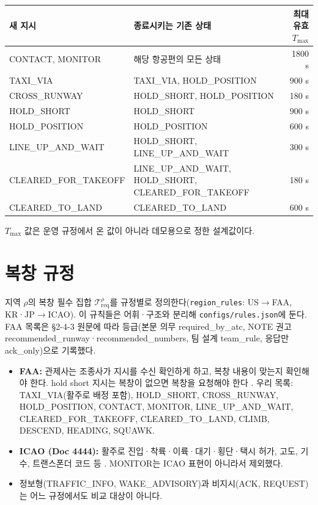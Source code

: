 \documentclass[10pt,a4paper]{article}
\newcommand{\cmd}[1]{\textsf{\small #1}}
\begin{document}
\begin{center}\small
\begin{tabular}{@{}l l r@{}}
\toprule
새 지시 & 종료시키는 기존 상태 & 최대 유효 $T_{\max}$\\\midrule
\cmd{CONTACT}, \cmd{MONITOR} & 해당 항공편의 모든 상태 & 1800 s\\
\cmd{TAXI\_VIA} & \cmd{TAXI\_VIA}, \cmd{HOLD\_POSITION} & 900 s\\
\cmd{CROSS\_RUNWAY} & \cmd{HOLD\_SHORT}, \cmd{HOLD\_POSITION} & 180 s\\
\cmd{HOLD\_SHORT} & \cmd{HOLD\_SHORT} & 900 s\\
\cmd{HOLD\_POSITION} & \cmd{HOLD\_POSITION} & 600 s\\
\cmd{LINE\_UP\_AND\_WAIT} & \cmd{HOLD\_SHORT}, \cmd{LINE\_UP\_AND\_WAIT} & 300 s\\
\cmd{CLEARED\_FOR\_TAKEOFF} & \cmd{LINE\_UP\_AND\_WAIT}, \cmd{HOLD\_SHORT}, \cmd{CLEARED\_FOR\_TAKEOFF} & 180 s\\
\cmd{CLEARED\_TO\_LAND} & \cmd{CLEARED\_TO\_LAND} & 600 s\\
\bottomrule
\end{tabular}
\end{center}
{\footnotesize $T_{\max}$ 값은 운영 규정에서 온 값이 아니라 데모용으로 정한 설계값이다.}

\section{복창 규정}\label{sec:readback}
지역 $\rho$의 복창 필수 집합 $\mathcal{T}_{\mathrm{req}}^{\rho}$를 규정별로 정의한다(\texttt{region\_rules}: US$\to$FAA, KR·JP$\to$ICAO). 이 규칙들은 어휘·구조와 분리해 \texttt{configs/rules.json}에 둔다. FAA 목록은 §2-4-3 원문에 따라 등급(본문 의무 required\_by\_atc, NOTE 권고 recommended\_runway·recommended\_numbers, 팀 설계 team\_rule, 응답만 ack\_only)으로 기록했다.
\begin{itemize}
\item \textbf{FAA:} 관제사는 조종사가 지시를 수신 확인하게 하고, 복창 내용이 맞는지 확인해야 한다. hold short 지시는 복창이 없으면 복창을 요청해야 한다 \cite{faa7110}. 우리 목록: \cmd{TAXI\_VIA}(활주로 배정 포함), \cmd{HOLD\_SHORT}, \cmd{CROSS\_RUNWAY}, \cmd{HOLD\_POSITION}, \cmd{CONTACT}, \cmd{MONITOR}, \cmd{LINE\_UP\_AND\_WAIT}, \cmd{CLEARED\_FOR\_TAKEOFF}, \cmd{CLEARED\_TO\_LAND}, \cmd{CLIMB}, \cmd{DESCEND}, \cmd{HEADING}, \cmd{SQUAWK}.
\item \textbf{ICAO (Doc 4444):} 활주로 진입·착륙·이륙·대기·횡단·택시 허가, 고도, 기수, 트랜스폰더 코드 등 \cite{icao4444}. MONITOR는 ICAO 표현이 아니라서 제외했다.
\item 정보형(\cmd{TRAFFIC\_INFO}, \cmd{WAKE\_ADVISORY})과 비지시(\cmd{ACK}, \cmd{REQUEST})는 어느 규정에서도 비교 대상이 아니다.
\end{itemize}
\end{document}
